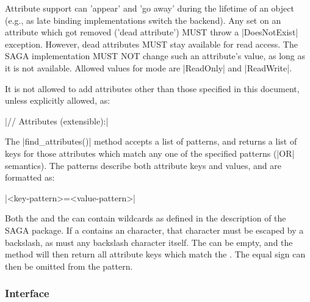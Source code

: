     Attribute support can 'appear' and 'go away' during the
    lifetime of an object (e.g., as late binding implementations
    switch the backend).  Any set on an attribute which
    got removed ('dead attribute') MUST throw a |DoesNotExist|
    exception.  However, dead attributes MUST stay available for
    read access.  The SAGA implementation MUST NOT change such an
    attribute's value, as long as it is not available.  Allowed
    values for mode are |ReadOnly| and |ReadWrite|.
 
    It is not allowed to add attributes other than
    those specified in this document, unless explicitly
    allowed, as:
 
    \shift |//  Attributes (extensible):|
 
    The |find_attributes()| method accepts a list of
    patterns, and returns a list of keys for those attributes
    which match any one of the specified patterns (|OR|
    semantics).  The patterns  describe both
    attribute keys and values, and are formatted as:
    
    \shift |<key-pattern>=<value-pattern>|
 
    Both the  and the  can
    contain wildcards as defined in the description of
    the SAGA  package.  If a
     contains an  character, that character
    must be escaped by a backslash, as must any backslash
    character itself.  The  can be empty, and the method
    will then return all attribute keys which match the
    .  The equal sign  can then be omitted
    from the pattern.
 
 
 \subsubsection*{Interface }
 
